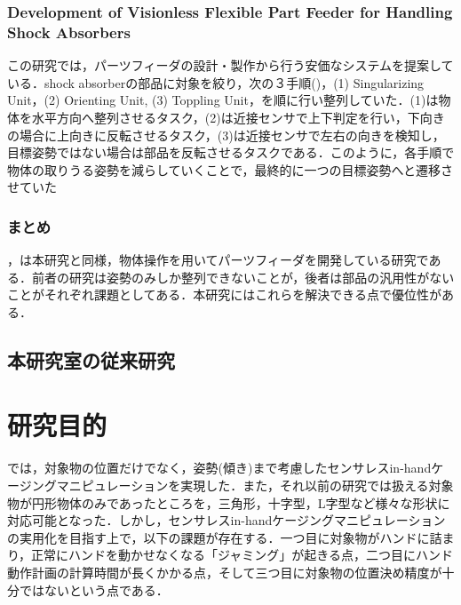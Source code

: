 \documentclass[a4paper,twoside,12pt,papersize, dvipdfmx]{iirthesis}
\begin{document}
\subsubsection{Development of Visionless Flexible Part Feeder for Handling Shock Absorbers \cite{Udhayakumar}}
この研究では，パーツフィーダの設計・製作から行う安価なシステムを提案している．shock absorberの部品に対象を絞り，次の３手順()，(1) Singularizing Unit，(2) Orienting Unit, (3) Toppling Unit，を順に行い整列していた．(1)は物体を水平方向へ整列させるタスク，(2)は近接センサで上下判定を行い，下向きの場合に上向きに反転させるタスク，(3)は近接センサで左右の向きを検知し，目標姿勢ではない場合は部品を反転させるタスクである．このように，各手順で物体の取りうる姿勢を減らしていくことで，最終的に一つの目標姿勢へと遷移させていた

\subsubsection{まとめ}

\cite{Akella}，\cite{Udhayakumar}は本研究と同様，物体操作を用いてパーツフィーダを開発している研究である．前者の研究は姿勢のみしか整列できないことが，後者は部品の汎用性がないことがそれぞれ課題としてある．本研究にはこれらを解決できる点で優位性がある．

\subsection{本研究室の従来研究}



\section{研究目的}\label{sec::intro::objective}
\cite{komiyama2020}では，対象物の位置だけでなく，姿勢(傾き)まで考慮したセンサレスin-handケージングマニピュレーションを実現した．また，それ以前の研究では扱える対象物が円形物体のみであったところを，三角形，十字型，L字型など様々な形状に対応可能となった．しかし，センサレスin-handケージングマニピュレーションの実用化を目指す上で，以下の課題が存在する．一つ目に対象物がハンドに詰まり，正常にハンドを動かせなくなる「ジャミング」が起きる点，二つ目にハンド動作計画の計算時間が長くかかる点，そして三つ目に対象物の位置決め精度が十分ではないという点である．\par
\end{document}
